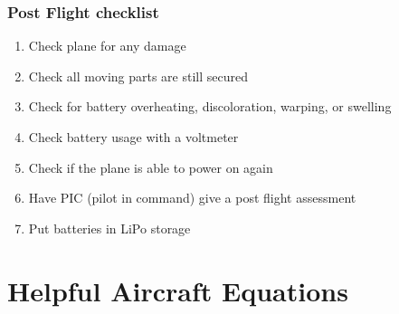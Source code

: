 \documentclass{article}
\begin{document}
\subsubsection{Post Flight checklist}
\begin{enumerate}[itemsep=-5pt]
  \item Check plane for any damage
  \item Check all moving parts are still secured
  \item Check for battery overheating, discoloration, warping, or swelling
  \item Check battery usage with a voltmeter
  \item Check if the plane is able to power on again
  \item Have PIC (pilot in command) give a post flight assessment
  \item Put batteries in LiPo storage
\end{enumerate}

\section{Helpful Aircraft Equations}
\end{document}
